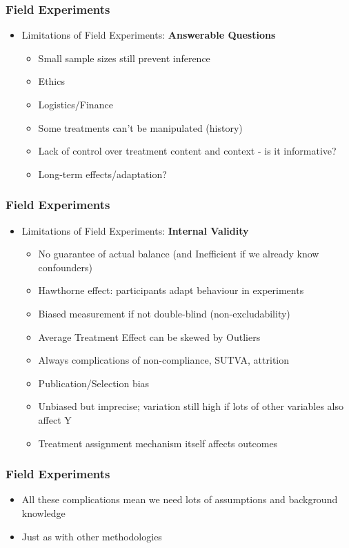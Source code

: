 \documentclass[xcolor=x11names,compress]{beamer}\usepackage[]{graphicx}\usepackage[]{color}
\renewcommand{\(}{\begin{columns}}
\renewcommand{\)}{\end{columns}}
\newcommand{\<}[1]{\begin{column}{#1}}
\renewcommand{\>}{\end{column}}
\begin{document}
\begin{frame}
\frametitle{Field Experiments}
\begin{itemize}
\item Limitations of Field Experiments: \textbf{Answerable Questions}
\pause
\begin{itemize}
\item Small sample sizes still prevent inference
\item Ethics
\item Logistics/Finance
\item Some treatments can't be manipulated (history)
\item Lack of control over treatment content and context - is it informative?
\item Long-term effects/adaptation?
\end{itemize}
\end{itemize}
\end{frame}

\begin{frame}
\frametitle{Field Experiments}
\begin{itemize}
\item Limitations of Field Experiments: \textbf{Internal Validity}
\pause
\begin{itemize}
\item No guarantee of actual balance (and Inefficient if we already know confounders)
\item Hawthorne effect: participants adapt behaviour in experiments
\item Biased measurement if not double-blind (non-excludability)
\item Average Treatment Effect can be skewed by Outliers
\item Always complications of non-compliance, SUTVA, attrition
\item Publication/Selection bias
\item Unbiased but imprecise; variation still high if lots of other variables also affect Y
\item Treatment assignment mechanism itself affects outcomes
\end{itemize}
\end{itemize}
\end{frame}

\begin{frame}
\frametitle{Field Experiments}
\begin{itemize}
\item All these complications mean we need lots of assumptions and background knowledge
\item Just as with other methodologies
\end{itemize}
\end{frame}
\end{document}
